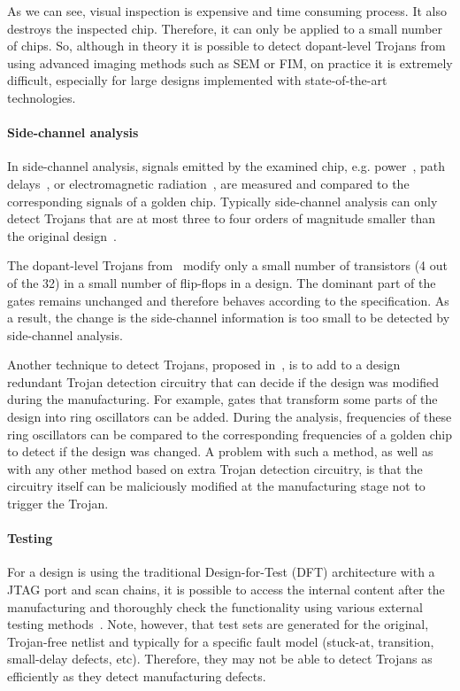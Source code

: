 \documentclass[a4paper]{llncs}
\begin{document}
As we can see, visual inspection is expensive and time consuming process. It also destroys the inspected chip. Therefore, it can only be applied to a small number of chips. So, although in theory it is possible to detect dopant-level Trojans from~\cite{BeRPB13} using advanced imaging methods such as SEM or FIM, on practice it is extremely difficult, especially for large designs implemented with state-of-the-art technologies.

\paragraph {\bf Side-channel analysis}

In side-channel analysis, signals emitted by the examined chip, e.g. power~\cite{RaPT10}, path delays~\cite{Ji08,YiM08}, or electromagnetic radiation~\cite{Ngo15}, are measured and compared to the corresponding signals of a golden chip. Typically side-channel analysis can only detect Trojans 
that are at most three to four orders of magnitude smaller than the original design~\cite{AgBKRS07}.

The dopant-level Trojans from~\cite{BeRPB13} modify only a small number of transistors (4 out of the 32)
in a small number of flip-flops in a design. The dominant part of the gates remains unchanged and therefore behaves according to the specification. As a result, the change is the side-channel information is too small to be detected by side-channel analysis. 

Another technique to detect Trojans, proposed in~\cite{RaJK11}, is to add to a design 
redundant Trojan detection circuitry that can decide if the design was modified during the manufacturing.
For example, gates that transform some parts of the design into ring oscillators can be added.
During the analysis, frequencies of these ring oscillators can be compared to the corresponding frequencies 
of a golden chip to detect if the design was changed. A problem with such a method, as well as with any other method based on extra Trojan detection circuitry, is that the circuitry itself can be maliciously modified at the manufacturing stage not to trigger the Trojan.

\paragraph {\bf Testing}

For a design is using the traditional Design-for-Test (DFT) architecture with a JTAG port and scan chains, it is possible to access the internal content after the manufacturing and thoroughly check the functionality using various external testing methods~\cite{atpg}. Note, however, that test sets are generated for the original, Trojan-free netlist and typically for a specific fault model (stuck-at, transition, small-delay defects, etc). Therefore, they may not be able to detect Trojans as efficiently as they detect manufacturing defects.
\end{document}
